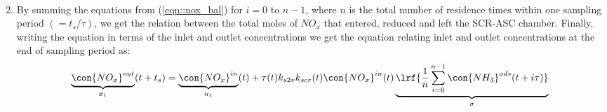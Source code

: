\begin{enumerate}
\begin{multline}
                        \label{eqn::ads_bal}
                \end{multline}
        \item By summing the equations from (\ref{eqn::nox_bal}) for  $i = 0$ to $n-1$, where $n$ is the total number of residence times within one sampling period $(= t_s/\tau)$, we get the relation between the total moles of $NO_x$ that entered, reduced and left the SCR-ASC chamber. Finally, writing the equation in terms of the inlet and outlet concentrations we get the equation relating inlet and outlet concentrations at the end of sampling period as:
                \begin{multline}
                        \underbrace{\con{NO_x}^{out}}_{x_1}(t + t_s) =
                                \underbrace{\con{NO_x}^{in}}_{u_1}(t) + \tau(t) k_{s2v} k_{scr}(t) \con{NO_x}^{in}(t) \underbrace{\lrf{\frac{1}{n} \sum_{i = 0}^{n-1} \con{NH_3}^{ads}(t + i \tau)}}_{\sigma}
                        \label{eqn::nox_avg}
                \end{multline}


\end{enumerate}
